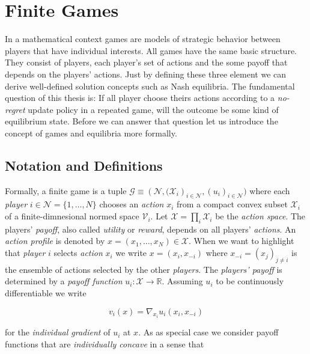 
\chapter{Finite Games}\label{chapter:finiteGames}

In a mathematical context games are models of strategic behavior between players that have individual interests. All games have the same basic structure. They consist of players, each player's set of actions and the some payoff that depends on the players' actions. Just by defining these three element we can derive well-defined solution concepts such as Nash equilibria. The fundamental question of this thesis is: If all player choose theirs actions according to a \textit{no-regret} update policy in a repeated game, will the outcome be some kind of equilibrium state. Before we can answer that question let us introduce the concept of games and equilibria more formally.


\section{Notation and Definitions}\label{section:notationAndDefinitionsGames}

Formally, a finite game is a tuple $\mathcal{G} \equiv (\mathcal{N}, {(\mathcal{X}_i})_{i\in\mathcal{N}},{(u_i)}_{i\in\mathcal{N}})$ where each \textit{player} $i \in \mathcal{N} = \{1,\dots,N\}$ chooses an \textit{action} $x_i$ from a compact convex subset $\mathcal{X}_i$ of a finite-dimnesional normed space $\mathcal{V}_i$. Let $\mathcal{X} = \prod_{i}\mathcal{X}_i$ be the \textit{action space}. The players' \textit{payoff}, also called \textit{utility} or \textit{reward}, depends on all players' \textit{actions}. An \textit{action profile} is denoted by $x = (x_1,\dots,x_N) \in \mathcal{X}$. When we want to highlight that \textit{player} $i$ selects \textit{action} $x_i$ we write $x = (x_i,x_{-i})$ where $x_{-i} = {(x_j)}_{j\neq i}$ is the ensemble of actions selected by the other \textit{players}. The \textit{players' payoff} is determined by a \textit{payoff function} $u_i : \mathcal{X} \to \mathbb{R} $. Assuming $u_i$ to be continuously differentiable we write 

\begin{equation*}
    v_i(x) = \nabla_{x_i}u_i(x_i,x_{-i})
\end{equation*}

for the \textit{individual gradient} of $u_i$ at $x$. As as special case we consider payoff functions that are \textit{individually concave} in a sense that 

